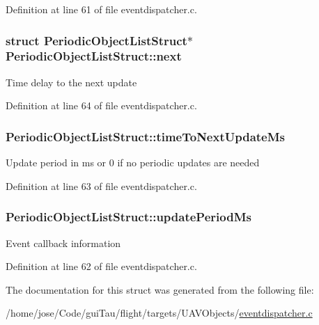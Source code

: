Definition at line 61 of file eventdispatcher.\-c.

\hypertarget{struct_periodic_object_list_struct_a53ed6bc407c59100bcfddb3a49ccb88f}{
\subsubsection[{next}]{\setlength{\rightskip}{0pt plus 5cm}struct {\bf Periodic\-Object\-List\-Struct}$\ast$ Periodic\-Object\-List\-Struct\-::next}}\label{struct_periodic_object_list_struct_a53ed6bc407c59100bcfddb3a49ccb88f}
Time delay to the next update 

Definition at line 64 of file eventdispatcher.\-c.

\hypertarget{struct_periodic_object_list_struct_ac03f97c098b138d52415563b1dd2b333}{
\subsubsection[{time\-To\-Next\-Update\-Ms}]{ Periodic\-Object\-List\-Struct\-::time\-To\-Next\-Update\-Ms}}\label{struct_periodic_object_list_struct_ac03f97c098b138d52415563b1dd2b333}
Update period in ms or 0 if no periodic updates are needed 

Definition at line 63 of file eventdispatcher.\-c.

\hypertarget{struct_periodic_object_list_struct_a8473f34184b9b0caa6e10095501984f2}{
\subsubsection[{update\-Period\-Ms}]{ Periodic\-Object\-List\-Struct\-::update\-Period\-Ms}}\label{struct_periodic_object_list_struct_a8473f34184b9b0caa6e10095501984f2}
Event callback information 

Definition at line 62 of file eventdispatcher.\-c.



The documentation for this struct was generated from the following file\-:\begin{DoxyCompactItemize}
\item 
/home/jose/\-Code/gui\-Tau/flight/targets/\-U\-A\-V\-Objects/\hyperlink{eventdispatcher_8c}{eventdispatcher.\-c}\end{DoxyCompactItemize}
